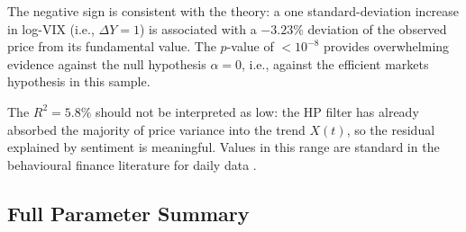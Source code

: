 \documentclass[12pt,a4paper]{article}
\theoremstyle{definition}
\theoremstyle{remark}
\begin{document}
\noindent The negative sign is consistent with the theory: a one
standard-deviation increase in log-VIX (i.e., $\Delta Y = 1$) is
associated with a $-3.23\%$ deviation of the observed price from its
fundamental value. The $p$-value of $<10^{-8}$ provides overwhelming
evidence against the null hypothesis $\alpha = 0$, i.e., against the
efficient markets hypothesis in this sample.

\noindent The $R^2 = 5.8\%$ should not be interpreted as low: the HP
filter has already absorbed the majority of price variance into the trend
$X(t)$, so the residual explained by sentiment is meaningful. Values
in this range are standard in the behavioural finance literature for
daily data \citep{baker2006}.

\subsection{Full Parameter Summary}
\end{document}
